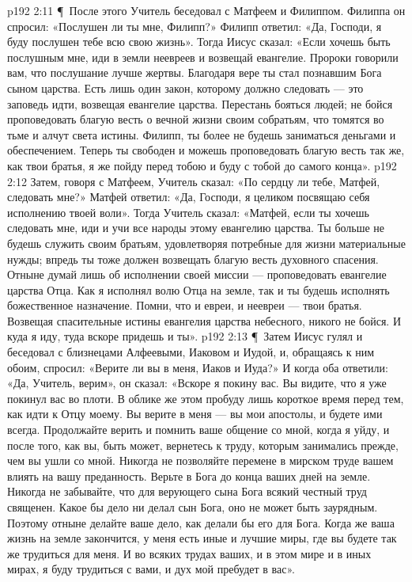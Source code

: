 \vs p192 2:11 \P\ После этого Учитель беседовал с Матфеем и Филиппом. Филиппа он спросил: «Послушен ли ты мне, Филипп?» Филипп ответил: «Да, Господи, я буду послушен тебе всю свою жизнь». Тогда Иисус сказал: «Если хочешь быть послушным мне, иди в земли неевреев и возвещай евангелие. Пророки говорили вам, что послушание лучше жертвы. Благодаря вере ты стал познавшим Бога сыном царства. Есть лишь один закон, которому должно следовать --- это заповедь идти, возвещая евангелие царства. Перестань бояться людей; не бойся проповедовать благую весть о вечной жизни своим собратьям, что томятся во тьме и алчут света истины. Филипп, ты более не будешь заниматься деньгами и обеспечением. Теперь ты свободен и можешь проповедовать благую весть так же, как твои братья, я же пойду перед тобою и буду с тобой до самого конца».
\vs p192 2:12 Затем, говоря с Матфеем, Учитель сказал: «По сердцу ли тебе, Матфей, следовать мне?» Матфей ответил: «Да, Господи, я целиком посвящаю себя исполнению твоей воли». Тогда Учитель сказал: «Матфей, если ты хочешь следовать мне, иди и учи все народы этому евангелию царства. Ты больше не будешь служить своим братьям, удовлетворяя потребные для жизни материальные нужды; впредь ты тоже должен возвещать благую весть духовного спасения. Отныне думай лишь об исполнении своей миссии --- проповедовать евангелие царства Отца. Как я исполнял волю Отца на земле, так и ты будешь исполнять божественное назначение. Помни, что и евреи, и неевреи --- твои братья. Возвещая спасительные истины евангелия царства небесного, никого не бойся. И куда я иду, туда вскоре придешь и ты».
\vs p192 2:13 \P\ Затем Иисус гулял и беседовал с близнецами Алфеевыми, Иаковом и Иудой, и, обращаясь к ним обоим, спросил: «Верите ли вы в меня, Иаков и Иуда?» И когда оба ответили: «Да, Учитель, верим», он сказал: «Вскоре я покину вас. Вы видите, что я уже покинул вас во плоти. В облике же этом пробуду лишь короткое время перед тем, как идти к Отцу моему. Вы верите в меня --- вы мои апостолы, и будете ими всегда. Продолжайте верить и помнить ваше общение со мной, когда я уйду, и после того, как вы, быть может, вернетесь к труду, которым занимались прежде, чем вы ушли со мной. Никогда не позволяйте перемене в мирском труде вашем влиять на вашу преданность. Верьте в Бога до конца ваших дней на земле. Никогда не забывайте, что для верующего сына Бога всякий честный труд священен. Какое бы дело ни делал сын Бога, оно не может быть заурядным. Поэтому отныне делайте ваше дело, как делали бы его для Бога. Когда же ваша жизнь на земле закончится, у меня есть иные и лучшие миры, где вы будете так же трудиться для меня. И во всяких трудах ваших, и в этом мире и в иных мирах, я буду трудиться с вами, и дух мой пребудет в вас».
